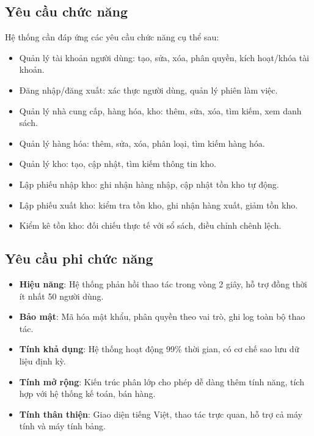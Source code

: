 \subsection{Yêu cầu chức năng}

Hệ thống cần đáp ứng các yêu cầu chức năng cụ thể sau:

\begin{itemize}[leftmargin=1.5cm]
    \item Quản lý tài khoản người dùng: tạo, sửa, xóa, phân quyền, kích hoạt/khóa tài khoản.
    \item Đăng nhập/đăng xuất: xác thực người dùng, quản lý phiên làm việc.
    \item Quản lý nhà cung cấp, hàng hóa, kho: thêm, sửa, xóa, tìm kiếm, xem danh sách.
    \item Quản lý hàng hóa: thêm, sửa, xóa, phân loại, tìm kiếm hàng hóa.
    \item Quản lý kho: tạo, cập nhật, tìm kiếm thông tin kho.
    \item Lập phiếu nhập kho: ghi nhận hàng nhập, cập nhật tồn kho tự động.
    \item Lập phiếu xuất kho: kiểm tra tồn kho, ghi nhận hàng xuất, giảm tồn kho.
    \item Kiểm kê tồn kho: đối chiếu thực tế với sổ sách, điều chỉnh chênh lệch.
\end{itemize}

\subsection{Yêu cầu phi chức năng}

\begin{itemize}[leftmargin=1.5cm]
    \item \textbf{Hiệu năng}: Hệ thống phản hồi thao tác trong vòng 2 giây, hỗ trợ đồng thời ít nhất 50 người dùng.
    \item \textbf{Bảo mật}: Mã hóa mật khẩu, phân quyền theo vai trò, ghi log toàn bộ thao tác.
    \item \textbf{Tính khả dụng}: Hệ thống hoạt động 99\% thời gian, có cơ chế sao lưu dữ liệu định kỳ.
    \item \textbf{Tính mở rộng}: Kiến trúc phân lớp cho phép dễ dàng thêm tính năng, tích hợp với hệ thống kế toán, bán hàng.
    \item \textbf{Tính thân thiện}: Giao diện tiếng Việt, thao tác trực quan, hỗ trợ cả máy tính và máy tính bảng.
\end{itemize}

